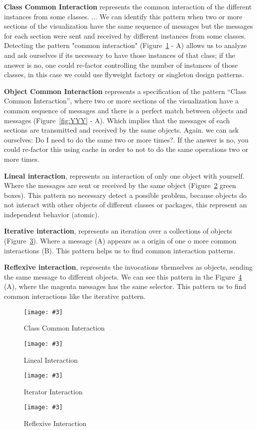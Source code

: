 \documentclass{sig-alternate}
\newcommand{\fig}[4]{
	\begin{figure}[#1]
		\centering
		\texttt{[image: \#3]}
		\caption{\label{fig:#3}#4}
	\end{figure}}
\newcommand{\figref}[1]{Figure~\ref{fig:#1}}
\begin{document}
{\bf Class Common Interaction} represents the common interaction of the different instances from some classes. ... We can identify this pattern when two or more sections of the visualization have the same sequence of messages but the messages for each section were sent and received by different instances from some classes. Detecting the pattern "common interaction" (\figref{ClassIdentity} - A) allows us to analyze and ask ourselves if its necessary to have those instances of that class; if the answer is no, one could re-factor controlling the number of instances of those classes, in this case we could use flyweight factory or singleton design patterns.

{\bf Object Common Interaction} represents a specification of the pattern ``Class Common Interaction'', where two or more sections of the visualization have a common sequence of messages and there is a perfect match between objects and messages (\figref{YYY} - A). Which implies that the messages of each sections are transmitted and received by the same objects. Again. we can ask ourselves: Do I need to do the same two or more times?.  If the answer is no, you could re-factor this using cache in order to not to do the same operations two or more times.

{\bf Lineal interaction}, represents an interaction of only one object with yourself. Where the messages are sent or received by the same object (\figref{LinealInteraction} green boxes). This pattern no necessary detect a possible problem, because objects do not interact with other objects of different classes or packages, this represent an independent behavior (atomic).


{\bf Iterative interaction}, represents an iteration over a collections of objects (\figref{IteratorPattern}). Where a message (A) appears as a origin of one o more common interactions (B). This pattern helps us to find common interaction patterns.
	
{\bf Reflexive interaction}, represents the invocations themselves as objects, sending the same message to different objects. We can see this pattern in the \figref{ReflexivePattern} (A), where the magenta messages has the same selector. This pattern us to find common interactions like the iterative pattern.


\fig{}{0.5}{ClassIdentity}{ Class Common Interaction}
\fig{}{0.5}{LinealInteraction}{Lineal Interaction}
\fig{}{0.5}{IteratorPattern}{Iterator Interaction}
\fig{}{0.5}{ReflexivePattern}{Reflexive Interaction}
\end{document}
